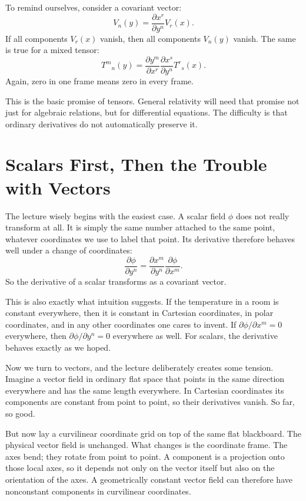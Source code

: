To remind ourselves, consider a covariant vector:
\begin{equation}
V_n(y)=\frac{\partial x^r}{\partial y^n}V_r(x).
\end{equation}
If all components \(V_r(x)\) vanish, then all components \(V_n(y)\) vanish. The same is true for a mixed tensor:
\begin{equation}
T^m{}_n(y)=\frac{\partial y^m}{\partial x^r}\frac{\partial x^s}{\partial y^n}T^r{}_s(x).
\end{equation}
Again, zero in one frame means zero in every frame.

This is the basic promise of tensors. General relativity will need that promise not just for algebraic relations, but for differential equations. The difficulty is that ordinary derivatives do not automatically preserve it.

\section{Scalars First, Then the Trouble with Vectors}

The lecture wisely begins with the easiest case. A scalar field \(\phi\) does not really transform at all. It is simply the same number attached to the same point, whatever coordinates we use to label that point. Its derivative therefore behaves well under a change of coordinates:
\begin{equation}
\frac{\partial \phi}{\partial y^n}
=
\frac{\partial x^m}{\partial y^n}
\frac{\partial \phi}{\partial x^m}.
\end{equation}
So the derivative of a scalar transforms as a covariant vector.

This is also exactly what intuition suggests. If the temperature in a room is constant everywhere, then it is constant in Cartesian coordinates, in polar coordinates, and in any other coordinates one cares to invent. If \(\partial \phi/\partial x^m=0\) everywhere, then \(\partial \phi/\partial y^n=0\) everywhere as well. For scalars, the derivative behaves exactly as we hoped.

Now we turn to vectors, and the lecture deliberately creates some tension. Imagine a vector field in ordinary flat space that points in the same direction everywhere and has the same length everywhere. In Cartesian coordinates its components are constant from point to point, so their derivatives vanish. So far, so good.

But now lay a curvilinear coordinate grid on top of the same flat blackboard. The physical vector field is unchanged. What changes is the coordinate frame. The axes bend; they rotate from point to point. A component is a projection onto those local axes, so it depends not only on the vector itself but also on the orientation of the axes. A geometrically constant vector field can therefore have nonconstant components in curvilinear coordinates.

